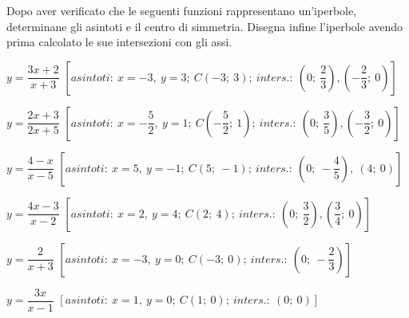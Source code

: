 \begin{esercizio}
  \label{ese:div.003}
  Dopo aver verificato che le seguenti funzioni rappresentano 
un'iperbole, determinane gli asintoti e il centro di simmetria. Disegna 
infine l'iperbole avendo prima calcolato le sue intersezioni con gli assi.
  \begin{enumeratea}
\item \(y= \dfrac{3x+2}{x+3} \)
\hfill \(\left[asintoti:~ x=-3,~ y=3;~ C(-3;~ 3); ~inters.:~ \left(0;~  
\dfrac{2}{3} \right), \left(- \dfrac{2}{3} ;~ 0\right)\right]\)
\item \(y= \dfrac{2x+3}{2x+5} \)
\hfill \(\left[asintoti:~ x=- \dfrac{5}{2} ,~ y=1;~C\left(-\dfrac{5}{2};~ 
1\right);~ inters.:~ \left(0;~  \dfrac{3}{5} \right), \left(- \dfrac{3}{2} 
;~ 0\right)\right]\)
\item \(y= \dfrac{4-x}{x-5} \)
\hfill \(\left[asintoti:~ x=5,~ y=-1;~ C(5;~-1);~ inters.:~\left(0;~ 
-\dfrac{4}{5} \right), ~(4;~0)\right]\)
\item \(y= \dfrac{4x-3}{x-2} \)
\hfill \(\left[asintoti: ~x=2,~ y=4;~ C(2;~4);~ inters.:~ \left(0; ~ 
\dfrac{3}{2} \right), \left(\dfrac{3}{4};~0\right)\right]\)
\item \(y= \dfrac{2}{x+3} \)
\hfill \(\left[asintoti: ~x=-3,~ y=0;~ C(-3;~0);~ inters.:~\left(0;~ 
-\dfrac{2}{3} \right)\right]\)
\item \(y= \dfrac{3x}{x-1} \)
\hfill \(\left[asintoti:~ x=1,~ y=0;~ C(1;~0); ~inters.: ~(0;~ 0)\right]\)
\end{enumeratea}
\end{esercizio}

% 
% 
